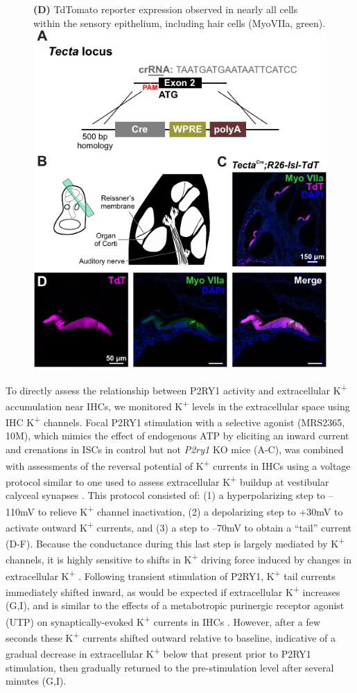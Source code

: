 \documentclass[9pt,lineno]{elife}
\begin{document}
\begin{figure} [t!]
\begin{fullwidth}
{\textbf{(D)} TdTomato reporter expression observed in nearly all cells within the sensory epithelium, including hair cells (MyoVIIa, green).
}
{\includegraphics[width=.63\linewidth]{figures/Fig4p1.pdf}}\label{figsupp:sf4p1}
\end{fullwidth}
\end{figure}

To directly assess the relationship between P2RY1 activity and extracellular K\textsuperscript{+} accumulation near IHCs, we monitored K\textsuperscript{+} levels in the extracellular space using IHC K\textsuperscript{+} channels. Focal P2RY1 stimulation with a selective agonist (MRS2365, 10\textmu M), which mimics the effect of endogenous ATP by eliciting an inward current and crenations in ISCs in control but not \textit{P2ry1} KO mice (A-C), was combined with assessments of the reversal potential of K\textsuperscript{+} currents in IHCs using a voltage protocol similar to one used to assess extracellular K\textsuperscript{+} buildup at vestibular calyceal synapses \citep{Lim2011}. This protocol consisted of: (1) a hyperpolarizing step to --110mV to relieve K\textsuperscript{+} channel inactivation, (2) a depolarizing step to +30mV to activate outward K\textsuperscript{+} currents, and (3) a step to --70mV to obtain a ``tail'' current (D-F). Because the conductance during this last step is largely mediated by K\textsuperscript{+} channels, it is highly sensitive to shifts in K\textsuperscript{+} driving force induced by changes in extracellular K\textsuperscript{+} \citep{Contini2017,Lim2011}. Following transient stimulation of P2RY1, K\textsuperscript{+} tail currents immediately shifted inward, as would be expected if extracellular K\textsuperscript{+} increases (G,I), and is similar to the effects of a metabotropic purinergic receptor agonist (UTP) on synaptically-evoked K\textsuperscript{+} currents in IHCs \citep{Wang2015}. However, after a few seconds these K\textsuperscript{+} currents shifted outward relative to baseline, indicative of a gradual decrease in extracellular K\textsuperscript{+} below that present prior to P2RY1 stimulation, then gradually returned to the pre-stimulation level after several minutes (G,I). 
\end{document}
